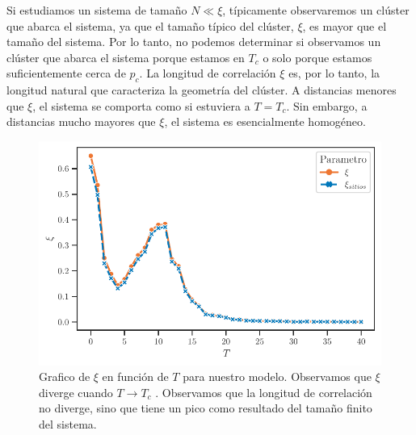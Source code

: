 Si estudiamos un sistema de tamaño $N \ll\xi$, típicamente observaremos un clúster que abarca el sistema, ya que el tamaño típico del clúster, $\xi$, es mayor que el tamaño del sistema. Por lo tanto, no podemos determinar si observamos un clúster que abarca el sistema porque estamos en $T_c$ o solo porque estamos suficientemente cerca de $p_c$.  La longitud de correlación $\xi$ es, por lo tanto, la longitud natural que caracteriza la geometría del clúster. A distancias menores que $\xi$, el sistema se comporta como si estuviera a $T = T_c$. Sin embargo, a distancias mucho mayores que $\xi$, el sistema es esencialmente homogéneo.


\begin{figure}[h!]
	\centering\includegraphics[width=\imsize]{correlacion_modelo.pdf}
	\caption[ Grafico de $\xi$ en función de $T$ para nuestro modelo.  ]{ Grafico de $\xi$ en función de $T$ para nuestro modelo. Observamos que $\xi$ diverge cuando $T \to T_c$ . Observamos que la longitud de correlación no diverge, sino que tiene un pico  como resultado del tamaño finito del sistema. } \label{fig:correlacion_modelo}
\end{figure}










